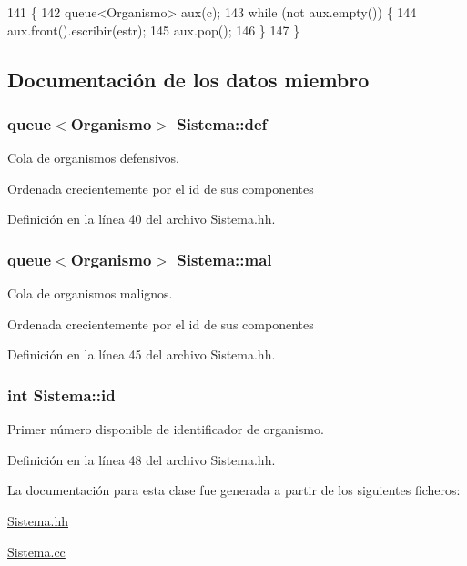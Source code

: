 \begin{DoxyCode}
141 \{
142   queue<Organismo> aux(c);
143   \textcolor{keywordflow}{while} (not aux.empty()) \{
144     aux.front().escribir(estr);
145     aux.pop();
146   \}
147 \}
\end{DoxyCode}


\subsection{Documentación de los datos miembro}
\hypertarget{class_sistema_a7311a56f7b8336096ca52a744c4d3804}{
\subsubsection[{def}]{\setlength{\rightskip}{0pt plus 5cm}queue$<${\bf Organismo}$>$ Sistema\+::def\hspace{0.3cm}{\ttfamily [private]}}}\label{class_sistema_a7311a56f7b8336096ca52a744c4d3804}


Cola de organismos defensivos. 

Ordenada crecientemente por el id de sus componentes 

Definición en la línea 40 del archivo Sistema.\+hh.

\hypertarget{class_sistema_a11fa1af3dde26025dd10b3ac103f426e}{
\subsubsection[{mal}]{\setlength{\rightskip}{0pt plus 5cm}queue$<${\bf Organismo}$>$ Sistema\+::mal\hspace{0.3cm}{\ttfamily [private]}}}\label{class_sistema_a11fa1af3dde26025dd10b3ac103f426e}


Cola de organismos malignos. 

Ordenada crecientemente por el id de sus componentes 

Definición en la línea 45 del archivo Sistema.\+hh.

\hypertarget{class_sistema_a69ba5e2cce55afc2a47d899a1100a42a}{
\subsubsection[{id}]{\setlength{\rightskip}{0pt plus 5cm}int Sistema\+::id\hspace{0.3cm}{\ttfamily [private]}}}\label{class_sistema_a69ba5e2cce55afc2a47d899a1100a42a}


Primer número disponible de identificador de organismo. 



Definición en la línea 48 del archivo Sistema.\+hh.



La documentación para esta clase fue generada a partir de los siguientes ficheros\+:\begin{DoxyCompactItemize}
\item 
\hyperlink{_sistema_8hh}{Sistema.\+hh}\item 
\hyperlink{_sistema_8cc}{Sistema.\+cc}\end{DoxyCompactItemize}
